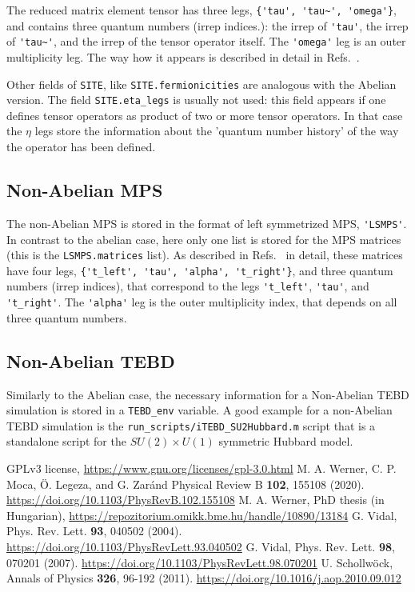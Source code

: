 \documentclass[aps,prb,twocolumn,showpacs,preprintnumbers,amsmath,amssymb, superscriptaddressm, nofootinbib]{revtex4-2}   %
\begin{document}
The reduced matrix element tensor has three legs, \verb|{'tau', 'tau~', 'omega'}|, and contains three quantum numbers (irrep indices.): the irrep of \verb|'tau'|, the irrep of \verb|'tau~'|, and the irrep of the tensor operator itself. The \verb|'omega'| leg is an outer multiplicity leg. The way how it appears is described in detail in Refs.~. 

Other fields of \verb|SITE|, like \verb|SITE.fermionicities| are analogous with the Abelian version. The field \verb|SITE.eta_legs| is usually not used: this field appears if one defines tensor operators as product of two or more tensor operators. In that case the $\eta$ legs store the information about the 'quantum number history' of the way the operator has been defined. 

\subsection{Non-Abelian MPS}
The non-Abelian MPS is stored in the format of left symmetrized MPS, \verb|'LSMPS'|. In contrast to the abelian case, here only one list is stored for the MPS matrices (this is the \verb|LSMPS.matrices| list). As described in Refs.~ in detail, these matrices have four legs, \verb|{'t_left', 'tau', 'alpha', 't_right'}|, and three quantum numbers (irrep indices), that correspond to the legs \verb|'t_left'|, \verb|'tau'|, and \verb|'t_right'|. The \verb|'alpha'| leg is the outer multiplicity index, that depends on all three quantum numbers.


\subsection{Non-Abelian TEBD}
Similarly to the Abelian case, the necessary information for a Non-Abelian TEBD simulation is stored in a \verb|TEBD_env| variable. A good example for a non-Abelian TEBD simulation is the \verb|run_scripts/iTEBD_SU2Hubbard.m| script that is a standalone script for the $SU(2) \times U(1)$ symmetric Hubbard model.





\begin{thebibliography}{99}
 GPLv3 license, \url{https://www.gnu.org/licenses/gpl-3.0.html}
 M. A.  Werner, C. P.  Moca, \"O. Legeza, and G. Zar\'and
Physical Review B \textbf{102}, 155108 (2020). \url{https://doi.org/10.1103/PhysRevB.102.155108}
 M. A. Werner, PhD thesis (in Hungarian), \url{https://repozitorium.omikk.bme.hu/handle/10890/13184}
 G. Vidal, Phys. Rev. Lett. \textbf{93}, 040502 (2004). \url{https://doi.org/10.1103/PhysRevLett.93.040502}
 G. Vidal, Phys. Rev. Lett. \textbf{98}, 070201 (2007). \url{https://doi.org/10.1103/PhysRevLett.98.070201}
 U. Schollwöck, Annals of Physics \textbf{326}, 96-192 (2011).  \url{https://doi.org/10.1016/j.aop.2010.09.012}
\end{thebibliography}
\end{document}
